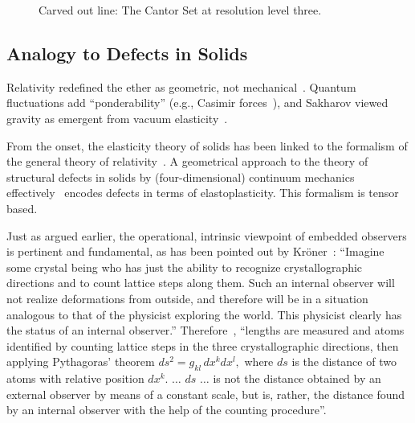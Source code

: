 \documentclass[%
  reprint,
  superscriptaddress,
  showpacs,
  showkeys,
  amsmath,amssymb,
  pra,
  longbibliography,
  floatfix,
]{revtex4-2}
\begin{document}
\begin{figure}[ht]
\centering
{}
\caption{Carved out line:  The Cantor Set at resolution level three.}
\label{fig:Cantor}
\end{figure}


\subsection{Analogy to Defects in Solids}
Relativity redefined the ether as geometric, not mechanical~\cite{einstein-aether-en}. Quantum fluctuations add ``ponderability'' (e.g., Casimir forces~\cite{Casimir_1948}), and Sakharov viewed gravity as emergent from vacuum elasticity~\cite{Sakharov-67}.

From the onset, the elasticity theory of solids has been linked to the formalism of the general theory of relativity~\cite{schaefer-1953,zaanen-2022}.
A geometrical approach to the theory of structural defects in solids by (four-dimensional)
continuum mechanics~\cite{Kroner-1958,kroner-1959,Kosevich-1962,Turski-66,kroner-1967,kroner-1975,Kossecka_deWit-77,kroner-1985,kroner-1990,kroner-2001,amari-1968,gunther-1972,Guenther-1979,gunther-1981,gunther-1983,golebiewska-lasota-1979a,golebiewska-lasota-1979b}
effectively~\cite{anderson:73} encodes defects in terms of  elastoplasticity.
This formalism is tensor based.

Just as argued earlier, the operational, intrinsic viewpoint of embedded observers is pertinent and fundamental,
as has been pointed out by Kr\"oner~\cite{kroner-1990}:
``Imagine some crystal being who has just the ability to recognize
crystallographic directions and to count lattice steps along them. Such an
internal observer will not realize deformations from outside, and therefore
will be in a situation analogous to that of the physicist exploring the world.
This physicist clearly has the status of an internal observer.''
Therefore~\cite{kroner-1985}, ``lengths are measured and atoms identified by
counting lattice steps in the three crystallographic directions, then applying Pythagoras' theorem
$
ds^2 = g_{kl}\, dx^k dx^l,
$
where $ds$ is the distance of two atoms with relative position $dx^k$.
$\ldots$
$ds$ $\ldots$ is not the distance obtained by
an external observer by means of a constant scale, but is, rather, the distance found
by an internal observer with the help of the counting procedure''.
\end{document}
